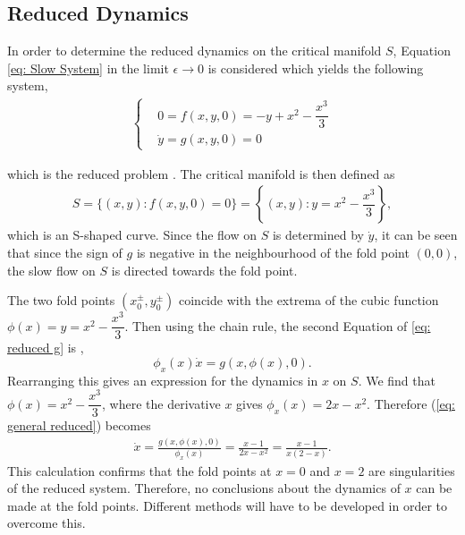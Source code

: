 \subsection{Reduced Dynamics}

In order to determine the reduced dynamics on the critical manifold $S$, Equation \ref{eq: Slow System} in the limit $\epsilon\to 0$ is considered which yields the following system,
\begin{align}
\begin{cases}
    &0=f(x,y,0)=-y+x^2-\dfrac{x^3}{3}\\
        &\dot{y}=g(x,y,0)=0 \label{eq: reduced g}
\end{cases}
\end{align}

which is the reduced problem \citep{Kuehn}. 
The critical manifold is then defined as 
\begin{align}
S= \{ (x,y) : f(x,y,0)=0 \} = \left\{ (x,y) : y = x^2-\dfrac{x^3}{3}\right \},
\end{align}
which is an S-shaped curve. 
Since the flow on $S$ is determined by $\dot{y}$, it can be seen that since the sign of $g$ is negative in the neighbourhood of the fold point $(0,0)$, the slow flow on $S$ is directed towards the fold point.

The two  fold points $(x_0^\pm,y_0^\pm)$ coincide with the extrema of the cubic function  $ \phi(x) = y = x^2-\dfrac{x^3}{3}$.
Then using the chain rule, the second Equation of \ref{eq: reduced g} is  \citep{krupa2001},
\begin{equation}
    \phi_x(x)\dot{x}=g(x,\phi(x),0).
    \label{eq: general reduced}
\end{equation}
Rearranging this gives an expression for the dynamics in $x$ on $S$.
We find that $\phi(x)=x^2-\dfrac{x^3}{3}$, where the derivative \wrt $x$ gives $\phi_x(x)=2x-x^2$.
Therefore (\ref{eq: general reduced}) becomes 
\begin{align*}
	\dot{x} = \frac{g(x,\phi(x),0)}{ \phi_x(x)} = \frac{ x-1}{2x-x^2} =\frac{ x-1}{x(2-x)}.
\end{align*}
This calculation confirms that the fold points at $x=0$ and $x=2$ are singularities of the reduced system. Therefore, no conclusions about the dynamics of $x$ can be made at the fold points. Different methods will have to be developed in order to overcome this.

